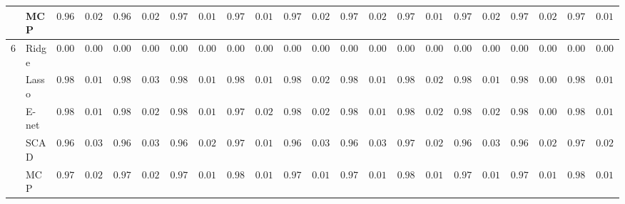 \begin{tabular}{p{0.2cm}p{1cm}|p{0.6cm}p{0.6cm}|p{0.6cm}p{0.6cm}p{0.6cm}p{0.6cm}p{0.6cm}p{0.6cm}|p{0.6cm}p{0.6cm}p{0.6cm}p{0.6cm}p{0.6cm}p{0.6cm}|p{0.6cm}p{0.6cm}p{0.6cm}p{0.6cm}p{0.6cm}p{0.6cm}}
 & MCP  & $0.9672$ & $0.0254$ & $0.9662$ & $0.0282$ & $0.9769$ & $0.0140$ & $0.9795$ & $0.0123$ & $0.9739$ & $0.0204$ & $0.9734$ & $0.0210$ & $0.9762$ & $0.0193$ & $0.9709$ & $0.0214$ & $0.9723$ & $0.0219$ & $0.9766$ & $0.0142$ \\\hline
6 & Ridge  & $0.0000$ & $0.0000$ & $0.0000$ & $0.0000$ & $0.0000$ & $0.0000$ & $0.0000$ & $0.0000$ & $0.0000$ & $0.0000$ & $0.0000$ & $0.0000$ & $0.0000$ & $0.0000$ & $0.0000$ & $0.0000$ & $0.0000$ & $0.0000$ & $0.0000$ & $0.0000$ \\
 & Lasso  & $0.9871$ & $0.0152$ & $0.9837$ & $0.0335$ & $0.9848$ & $0.0137$ & $0.9805$ & $0.0151$ & $0.9873$ & $0.0211$ & $0.9865$ & $0.0162$ & $0.9847$ & $0.0236$ & $0.9868$ & $0.0193$ & $0.9882$ & $0.0066$ & $0.9851$ & $0.0111$ \\
 & E-net  & $0.9871$ & $0.0152$ & $0.9839$ & $0.0290$ & $0.9840$ & $0.0154$ & $0.9742$ & $0.0249$ & $0.9872$ & $0.0211$ & $0.9857$ & $0.0184$ & $0.9841$ & $0.0247$ & $0.9867$ & $0.0203$ & $0.9881$ & $0.0074$ & $0.9828$ & $0.0157$ \\
 & SCAD  & $0.9636$ & $0.0389$ & $0.9613$ & $0.0357$ & $0.9648$ & $0.0268$ & $0.9734$ & $0.0182$ & $0.9633$ & $0.0385$ & $0.9617$ & $0.0359$ & $0.9715$ & $0.0286$ & $0.9602$ & $0.0381$ & $0.9671$ & $0.0279$ & $0.9719$ & $0.0238$ \\
 & MCP  & $0.9758$ & $0.0235$ & $0.9761$ & $0.0209$ & $0.9798$ & $0.0137$ & $0.9819$ & $0.0108$ & $0.9793$ & $0.0177$ & $0.9773$ & $0.0176$ & $0.9818$ & $0.0159$ & $0.9797$ & $0.0158$ & $0.9792$ & $0.0160$ & $0.9803$ & $0.0149$ \\
\hline 
\end{tabular}


